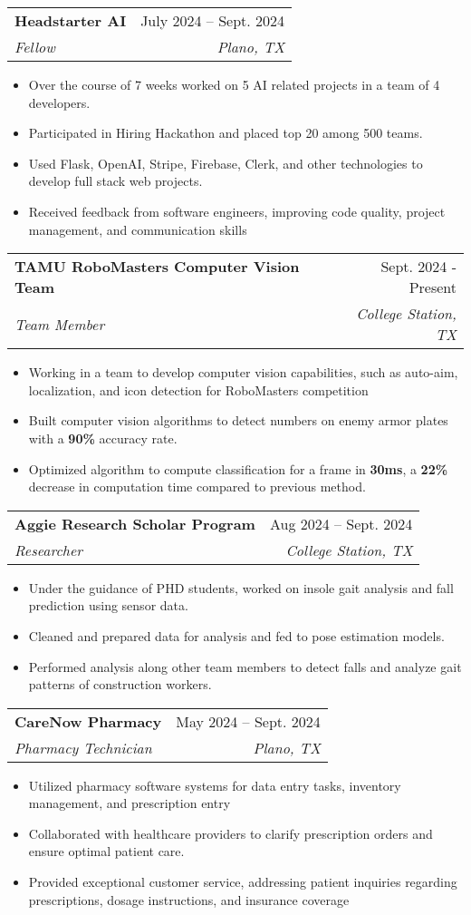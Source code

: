 \documentclass[letterpaper,11pt]{article}
\makeatletter
\newcommand{\resumeItem}[1]{
  \item\small{
    {#1 \vspace{-2pt}}
  }
}
\newcommand{\resumeSubheading}[4]{
  \vspace{-2pt}\item
    \begin{tabular*}{0.97\textwidth}[t]{l@{\extracolsep{\fill}}r}
      \textbf{#1} & #2 \\
      \textit{\small#3} & \textit{\small #4} \\
    \end{tabular*}\vspace{-7pt}
}
\newcommand{\resumeSubSubheading}[2]{
    \item
    \begin{tabular*}{0.97\textwidth}{l@{\extracolsep{\fill}}r}
      \textit{\small#1} & \textit{\small #2} \\
    \end{tabular*}\vspace{-7pt}
}
\newcommand{\resumeSubHeadingListEnd}{\end{itemize}}
\newcommand{\resumeItemListStart}{\begin{itemize}}
\newcommand{\resumeItemListEnd}{\end{itemize}\vspace{-5pt}}
\makeatother
\begin{document}
    \resumeSubheading
      {Headstarter AI}{July 2024 -- Sept. 2024}
      {Fellow}{Plano, TX}
      \resumeItemListStart
        \resumeItem{Over the course of 7 weeks worked on 5 AI related projects in a team of 4 developers.}
        \resumeItem{Participated in Hiring Hackathon and placed top 20 among 500 teams.}
        \resumeItem{Used Flask, OpenAI, Stripe, Firebase, Clerk, and other technologies to develop full stack web projects.}
        \resumeItem{Received feedback from software engineers, improving code quality, project management, and communication skills}
      \resumeItemListEnd

      \resumeSubheading
      {TAMU RoboMasters Computer Vision Team}{Sept. 2024 - Present}
      {Team Member}{College Station, TX}
      \resumeItemListStart
        \resumeItem{Working in a team to develop computer vision capabilities, such as auto-aim, localization, and icon detection for RoboMasters competition}
        \resumeItem{Built computer vision algorithms to detect numbers on enemy armor plates with a \textbf{90\%} accuracy rate.}
        \resumeItem{Optimized algorithm to compute classification for a frame in \textbf{30ms}, a \textbf{22\%} decrease in computation time compared to previous method.}
      \resumeItemListEnd

      \resumeSubheading
      {Aggie Research Scholar Program}{Aug 2024 -- Sept. 2024}
      {Researcher}{College Station, TX}
      \resumeItemListStart
        \resumeItem{Under the guidance of PHD students, worked on insole gait analysis and fall prediction using sensor data.}
        \resumeItem{Cleaned and prepared data for analysis and fed to pose estimation models.}
        \resumeItem{Performed analysis along other team members to detect falls and analyze gait patterns of construction workers.}
      \resumeItemListEnd

      \resumeSubheading
      {CareNow Pharmacy}{May 2024 -- Sept. 2024}
      {Pharmacy Technician}{Plano, TX}
      \resumeItemListStart
        \resumeItem{Utilized pharmacy software systems for data entry tasks, inventory management, and prescription entry}
        \resumeItem{Collaborated with healthcare providers to clarify prescription orders and ensure optimal patient care.}
        \resumeItem{Provided exceptional customer service, addressing patient inquiries regarding prescriptions, dosage instructions, and insurance coverage}
      \resumeItemListEnd
      
\end{document}
